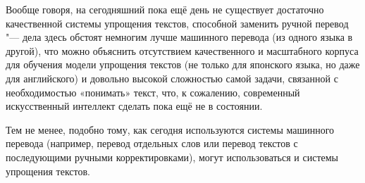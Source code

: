Вообще говоря, на сегодняшний пока ещё день не существует достаточно качественной системы упрощения текстов, способной заменить ручной перевод "--- дела здесь обстоят немногим лучше машинного перевода (из одного языка в другой), что можно объяснить отсутствием качественного и масштабного корпуса для обучения модели упрощения текстов (не только для японского языка, но даже для английского) и довольно высокой сложностью самой задачи, связанной с необходимостью «понимать» текст, что, к сожалению, современный искусственный интеллект сделать пока ещё не в состоянии.

Тем не менее, подобно тому, как сегодня используются системы машинного перевода (например, перевод отдельных слов или перевод текстов с последующими ручными корректировками), могут использоваться и системы упрощения текстов.
